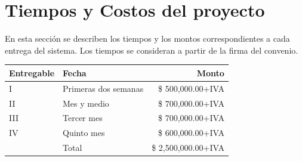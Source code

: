 \documentclass[10pt]{book}
\begin{document}
\section{Tiempos y Costos del proyecto}

	En esta sección se describen los tiempos y los montos correspondientes a cada entrega del sistema. Los  tiempos se consideran a partir de la firma del convenio.\\

\begin{tabular}{|l | l | r|}
	\hline
	{\bf Entregable}& {\bf Fecha} &{\bf Monto}  \\
	\hline
	I & Primeras dos semanas  & \$ 500,000.00+IVA\\
	\hline
	II & Mes y medio & \$ 700,000.00+IVA\\
	\hline
	III & Tercer mes & \$ 700,000.00+IVA\\
	\hline
	IV & Quinto mes & \$ 600,000.00+IVA\\
	\hline
	\hline
	 & Total & \$ 2,500,000.00+IVA\\
	\hline
\end{tabular}

\clossing
\end{document}
